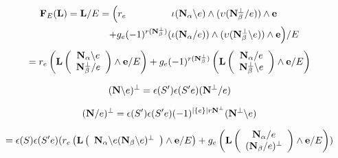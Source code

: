 {  %


\[
\begin{split}
  \mathbf{F}_E(\mathbf{L}) = \mathbf{L}/E 
   = \Big( r_e  \;\;\; \;\;\;\;\;\;\;\;\;\;\;\;\;\; & \iota(\mathbf{N}_{\alpha}\backslash e)  \wedge (\upsilon(\mathbf{N}_{\beta}^{\perp}/e))      \wedge  \mathbf{e} \\
   \;\;+ g_e (-1)^{r(\mathbf{N}_{\beta}^{\perp})} ( & \iota(\mathbf{N}_{\alpha}/e))\wedge(\upsilon(\mathbf{N}_{\beta}^{\perp}\backslash e))   \wedge  \mathbf{e}\Big) / E \\
\end{split}
\]
\[  = r_e\left(\mathbf{L}\left(\begin{array}{c} \mathbf{N}_{\alpha}\backslash e \\
    \mathbf{N}_{\beta}^{\perp}/e  \end{array} \right)  \wedge \mathbf{e} /E \right) +
   g_e(-1)^{r(\mathbf{N}_{\beta}^{\perp})}\left(\mathbf{L}\left(\begin{array}{c} \mathbf{N}_{\alpha} /e \\
    \mathbf{N}_{\beta}^{\perp} \backslash e \end{array} \right) \wedge \mathbf{e} /E \right)
   \]
   


\[{(\mathbf{N}\backslash e)^\perp = \epsilon(S')\epsilon(S'e)(\mathbf{N}^\perp/e)}\]


\[{(\mathbf{N}/e)^\perp = \epsilon(S')\epsilon(S'e)(-1)^{|\{e\}|r\mathbf{N}^\perp}(\mathbf{N}^\perp\backslash e)}\]
         




\[
= \epsilon(S)\epsilon(S'e)(r_e\left(\mathbf{L}\left(\begin{array}{c} \mathbf{N}_{\alpha}\backslash e 
    (\mathbf{N}_\beta\backslash e)^\perp  \end{array} \right)  \wedge \mathbf{e} /E \right) +
   g_e\left(\mathbf{L}\left(\begin{array}{c} \mathbf{N}_{\alpha} /e \\
    (\mathbf{N}_\beta / e)^\perp \end{array} \right) \wedge \mathbf{e} /E \right))
   \]

}
